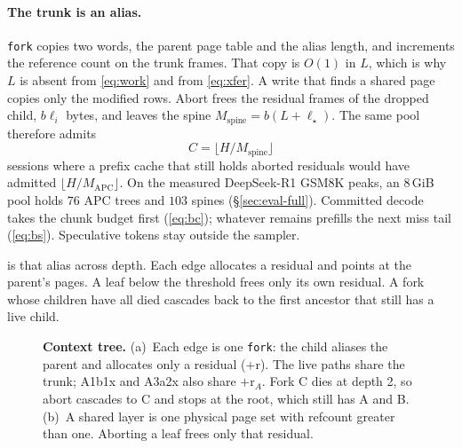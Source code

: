 \paragraph{The trunk is an alias.}
\texttt{fork} copies two words, the parent page table and the alias length, and increments the reference count on the trunk frames.
That copy is $O(1)$ in $L$, which is why $L$ is absent from \eqref{eq:work} and from \eqref{eq:xfer}.
A write that finds a shared page copies only the modified rows.
Abort frees the residual frames of the dropped child, $b\ell_i$ bytes, and leaves the spine $M_{\mathrm{spine}}=b(L+\ell_\star)$.
The same pool therefore admits
\begin{equation}
\label{eq:slots-main}
C=\bigl\lfloor H/M_{\mathrm{spine}}\bigr\rfloor
\end{equation}
sessions where a prefix cache that still holds aborted residuals would have admitted $\lfloor H/M_{\mathrm{APC}}\rfloor$.
On the measured DeepSeek-R1 GSM8K peaks, an $8$\,GiB pool holds $76$ APC trees and $103$ spines (\S\ref{sec:eval-full}).
Committed decode takes the chunk budget first (\eqref{eq:bc}); whatever remains prefills the next miss tail (\eqref{eq:bs}).
Speculative tokens stay outside the sampler.

 is that alias across depth.
Each edge allocates a residual and points at the parent's pages.
A leaf below the threshold frees only its own residual.
A fork whose children have all died cascades back to the first ancestor that still has a live child.

\begin{figure}[t]
\centering
\resizebox{\textwidth}{!}{}
\caption{\textbf{Context tree.}
(a)~Each edge is one \texttt{fork}: the child aliases the parent and allocates only a residual ($+$r).
The live paths share the trunk; A1b1x and A3a2x also share $+$r$_A$.
Fork C dies at depth 2, so abort cascades to C and stops at the root, which still has A and B.
(b)~A shared layer is one physical page set with refcount greater than one.
Aborting a leaf frees only that residual.}
\label{fig:tree}
\end{figure}
